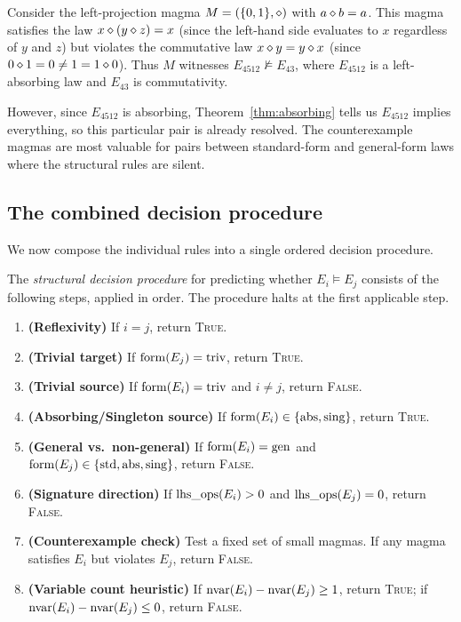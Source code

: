 \begin{example}\label{ex:counterexample}
Consider the left-projection magma $M = (\{0, 1\}, \diamond)$ with $a \diamond b = a$.
This magma satisfies the law $x \diamond (y \diamond z) = x$ (since the left-hand side
evaluates to $x$ regardless of $y$ and $z$) but violates the commutative law
$x \diamond y = y \diamond x$ (since $0 \diamond 1 = 0 \ne 1 = 1 \diamond 0$).  Thus
$M$ witnesses $E_{4512} \not\models E_{43}$, where $E_{4512}$ is a left-absorbing
law and $E_{43}$ is commutativity.

However, since $E_{4512}$ is absorbing, Theorem~\ref{thm:absorbing} tells us
$E_{4512}$ implies everything, so this particular pair is already resolved.  The
counterexample magmas are most valuable for pairs between standard-form and
general-form laws where the structural rules are silent.
\end{example}

\subsection{The combined decision procedure}

We now compose the individual rules into a single ordered decision procedure.

\begin{definition}\label{def:decision-procedure}
The \emph{structural decision procedure} for predicting whether $E_i \models E_j$
consists of the following steps, applied in order.  The procedure halts at the
first applicable step.
\begin{enumerate}[label=\textbf{Step \arabic*.}]
\item \textbf{(Reflexivity)} If $i = j$, return \textsc{True}.
\item \textbf{(Trivial target)} If $\mathrm{form}(E_j) = \text{triv}$, return
  \textsc{True}.
\item \textbf{(Trivial source)} If $\mathrm{form}(E_i) = \text{triv}$ and $i \ne j$,
  return \textsc{False}.
\item \textbf{(Absorbing/Singleton source)} If $\mathrm{form}(E_i) \in
  \{\text{abs}, \text{sing}\}$, return \textsc{True}.
\item \textbf{(General vs.\ non-general)} If $\mathrm{form}(E_i) = \text{gen}$ and
  $\mathrm{form}(E_j) \in \{\text{std}, \text{abs}, \text{sing}\}$, return
  \textsc{False}.
\item \textbf{(Signature direction)} If $\mathrm{lhs\_ops}(E_i) > 0$ and
  $\mathrm{lhs\_ops}(E_j) = 0$, return \textsc{False}.
\item \textbf{(Counterexample check)} Test a fixed set of small magmas.  If any
  magma satisfies $E_i$ but violates $E_j$, return \textsc{False}.
\item \textbf{(Variable count heuristic)} If $\mathrm{nvar}(E_i) - \mathrm{nvar}(E_j) \ge 1$,
  return \textsc{True}; if $\mathrm{nvar}(E_i) - \mathrm{nvar}(E_j) \le 0$, return
  \textsc{False}.
\end{enumerate}
\end{definition}

